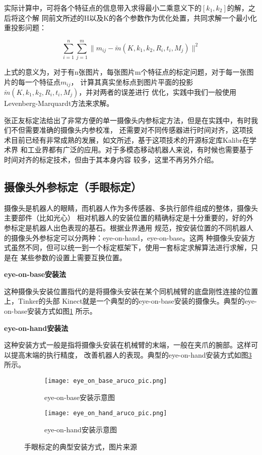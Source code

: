 实际计算中，可将各个特征点的信息带入求得最小二乘意义下的$[k_1, k_2]$的解，之后将这个解
同前文所述的H以及K的各个参数作为优化处置，共同求解一个最小化重投影问题：

\begin{equation}
	\sum_{i=1}^{n}\sum_{j=1}^{m} \| m_{ij} - \breve{m}(K, k_1, k_2, R_i, t_i, M_j)\|^2
\end{equation}

上式的意义为，对于有n张图片，每张图片m个特征点的标定问题，对于每一张图片的每一个特征点$m_{ij}$，
计算其真实坐标点到图片平面的投影$\breve{m}(K, k_1, k_2, R_i, t_i, M_j)$，并对两者的误差进行
优化，实践中我们一般使用Levenberg-Marquardt方法来求解。

张正友标定法给出了非常方便的单一摄像头内参标定方法，但是在实践中，有时我们不但需要准确的摄像头内参校准，
还需要对不同传感器进行时间对齐，这项技术目前已经有非常成熟的发展，如文\cite{furgale2013unified, furgale2012continuous}所述，基于这项技术的开源标定库Kalibr\cite{rehder2016extending}在学术界
和工业界都有广泛的应用。对于多模态移动机器人来说，有时候也需要基于时间对齐的标定技术，但由于其本身内容
较多，这里不再另外介绍。

\subsection{摄像头外参标定（手眼标定）}

摄像头是机器人的眼睛，而机器人作为多传感器、多执行部件组成的整体，摄像头主要部件（比如光心）
相对机器人的安装位置的精确标定是十分重要的，好的外参标定是机器人出色表现的基石。根据业界通用
规范，按安装位置的不同机器人的摄像头外参标定可以分两种：eye-on-hand，eye-on-base。这两
种摄像头安装方式虽然不同，但可以统一到一个标定框架下，使用一套标定求解算法进行求解，只是在
某些参数的设置上需要互换位置。

\noindent \textbf{eye-on-base安装法}

这种摄像头安装位置指代的是将摄像头安装在某个同机械臂的底盘刚性连接的位置上，Tinker的头部
Kinect就是一个典型的的eye-on-base安装的摄像头。典型的eye-on-base安装方式如图\ref{fig:eye_on_base}
所示。

\noindent \textbf{eye-on-hand安装法}

这种安装方式一般是指将摄像头安装在机械臂的末端，一般在夹爪的腕部。这样可以提高末端的执行精度，
改善机器人的表现。典型的eye-on-hand安装方式如图\ref{fig:eye_on_hand}所示。

\begin{figure}
\centering
\begin{subfigure}{.5\textwidth}
  \centering
  \texttt{[image: eye\_on\_base\_aruco\_pic.png]}
  \caption{eye-on-base安装示意图}
  \label{fig:eye_on_base}
\end{subfigure}%
\begin{subfigure}{.5\textwidth}
  \centering
  \texttt{[image: eye\_on\_hand\_aruco\_pic.png]}
  \caption{eye-on-hand安装示意图}
  \label{fig:eye_on_hand}
\end{subfigure}
\caption{手眼标定的典型安装方式，图片来源\cite{easy_handeye}}
\end{figure}


